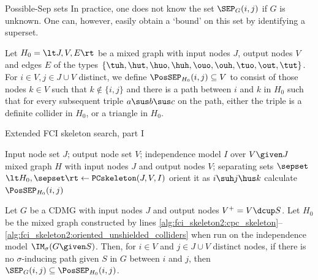 \begin{frame}{Possible-Sep sets}
In practice, one does not know the set $\SEP_G(i,j)$ if $G$ is unknown.
One can, however, easily obtain a `bound' on this set by identifying a superset.
\begin{Def}[\ref{def:possep}]
  Let $H_0 = \lt J,V,E\rt$ be a mixed graph with input nodes $J$, output nodes $V$ and edges $E$ of the types $\{\tuh,\hut,\huo,\huh,\ouo,\ouh,\tuo,\out,\tut\}$.
  For $i \in V, j \in J \cup V$ distinct, we define $\PosSEP_{H_0}(i,j) \subseteq V$ to consist of those nodes
  $k \in V$ such that $k \not\in \{i,j\}$ and there is a path between $i$ and $k$ in $H_0$ such that for
  every subsequent triple $a \sus b \sus c$ on the path, either the triple is a definite collider in $H_0$,
  or a triangle in $H_0$.
\end{Def}
\end{frame}

\begin{frame}{Extended FCI skeleton search, part I}
  \medskip

  {\footnotesize
  \begin{algorithmic}[1]
  \Input Input node set $J$; output node set $V$; independence model $I$ over $V \given J$
  \Output mixed graph $H$ with input nodes $J$ and output nodes $V$; separating sets $\sepset$
  \State $\lt H_0,\sepset \rt \leftarrow \mathtt{PCskeleton}(J,V,I)$
   
      \State orient it as $i \suh j \hus k$
    \EndIf
  \EndFor
   
    \State calculate $\PosSEP_{H_0}(i,j)$
  \EndFor
  \end{algorithmic}}

\begin{Lem}[\ref{lem:possep}]
  Let $G$ be a CDMG with input nodes $J$ and output nodes $V^+ = V \dcup S$.
  Let $H_0$ be the mixed graph constructed by lines 
  \ref{alg:fci_skeleton2:cpc_skeleton}--\ref{alg:fci_skeleton2:oriented_unshielded_colliders}
  when run on the independence model $\IM_\sigma(G \given S)$.
  Then, for $i \in V$ and $j \in J \cup V$ distinct nodes, if there is no $\sigma$-inducing path given $S$ in $G$ between $i$ and $j$, then
  $\SEP_G(i,j) \subseteq \PosSEP_{H_0}(i,j)$.
\end{Lem}
\end{frame}


